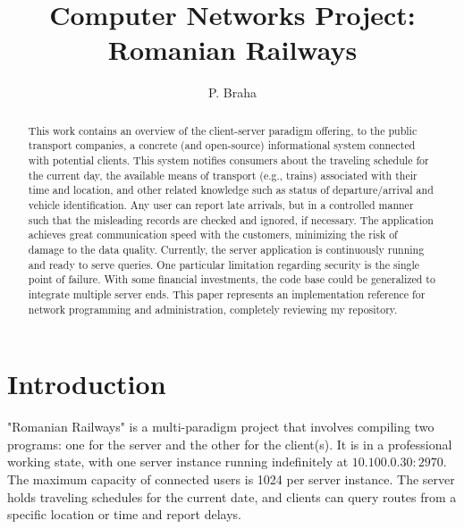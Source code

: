 \documentclass[runningheads]{llncs}
\begin{document}
\title{Computer Networks Project: \\ Romanian Railways}

\author{P. Braha}

\maketitle

\begin{abstract} This work contains an overview of the client-server paradigm offering, to the public transport companies, a concrete (and open-source) informational system connected with potential clients. This system notifies consumers about the traveling schedule for the current day, the available means of transport (e.g., trains) associated with their time and location, and other related knowledge such as status of departure/arrival and vehicle identification. Any user can report late arrivals, but in a controlled manner such that the misleading records are checked and ignored, if necessary. The application achieves great communication speed with the customers, minimizing the risk of damage to the data quality. Currently, the server application is continuously running and ready to serve queries. One particular limitation regarding security is the single point of failure. With some financial investments, the code base could be generalized to integrate multiple server ends. This paper represents an implementation reference for network programming and administration, completely reviewing my repository.

\end{abstract}


\section{Introduction}

"Romanian Railways" is a multi-paradigm project that involves compiling two programs: one for the server and the other for the client(s). It is in a professional working state, with one server instance running indefinitely at $10.100.0.30:2970$. The maximum capacity of connected users is 1024 per server instance. The server holds traveling schedules for the current date, and clients can query routes from a specific location or time and report delays.
\end{document}
